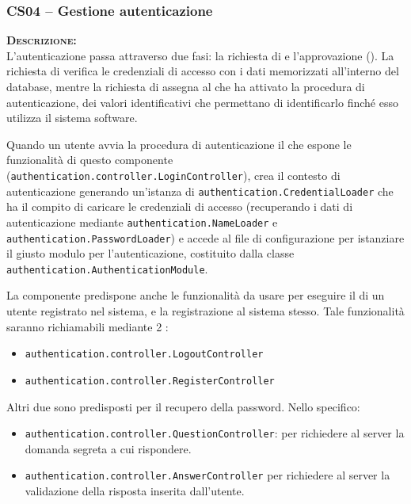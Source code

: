 \subsubsection{CS04 -- Gestione autenticazione}\label{sec:cs04}
\begin{description}
  \item{\scshape\bfseries Descrizione:}\\
L'autenticazione passa attraverso due fasi: la richiesta di  e l'approvazione (). La richiesta di  verifica le credenziali di accesso con i dati memorizzati all'interno del database, mentre la richiesta di  assegna al  che ha attivato la procedura di autenticazione, dei valori identificativi che permettano di identificarlo finché esso utilizza il sistema software.

Quando un utente avvia la procedura di autenticazione il  che espone le funzionalità di questo componente (\texttt{authentication.controller.LoginController}), crea il contesto di autenticazione generando un'istanza di \texttt{authentication.CredentialLoader} che ha il compito di caricare le credenziali di accesso (recuperando i dati di autenticazione mediante \texttt{authentication.NameLoader} e \texttt{authentication.PasswordLoader}) e accede al file di configurazione per istanziare il giusto modulo per l'autenticazione, costituito dalla classe \texttt{authentication.AuthenticationModule}.

La componente predispone anche le funzionalità da usare per eseguire il  di un utente registrato nel sistema, e la registrazione al sistema stesso. Tale funzionalità saranno richiamabili mediante 2 :
\begin{itemize}
	\item \texttt{authentication.controller.LogoutController}
	\item \texttt{authentication.controller.RegisterController}
\end{itemize}

Altri due  sono predisposti per il recupero della password. Nello specifico: 

\begin{itemize}
	\item \texttt{authentication.controller.QuestionController}: per richiedere al server la domanda segreta a cui rispondere.
	\item \texttt{authentication.controller.AnswerController} per richiedere al server la validazione della risposta inserita dall'utente.
\end{itemize}


\end{description}
